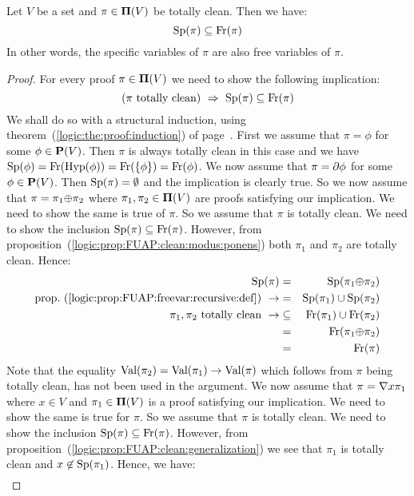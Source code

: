 \begin{prop}\label{logic:prop:FUAP:freevarproof:spec:free}
Let $V$ be a set and $\pi\in\mbox{${\bf\Pi}(V)$}$ be totally clean. Then we have:
    \[
    \mbox{\rm Sp}(\pi)\subseteq\mbox{\rm Fr}(\pi)
    \]
In other words, the specific variables of $\pi$ are also free
variables of $\pi$.
\end{prop}
\begin{proof}
For every proof $\pi\in\mbox{${\bf\Pi}(V)$}$ we need to show the following
implication:
    \[
    (\mbox{$\pi$ totally clean})\ \Rightarrow\ \spec(\pi)\subseteq\free(\pi)
    \]
We shall do so with a structural induction, using
theorem~(\ref{logic:the:proof:induction}) of
page~\pageref{logic:the:proof:induction}. First we assume that
$\pi=\phi$ for some $\phi\in\mbox{${\bf P}(V)$}$. Then $\pi$ is always totally clean
in this case and we have
$\mbox{\rm Sp}(\phi)=\mbox{\rm Fr}(\mbox{\rm Hyp}(\phi))=\mbox{\rm Fr}(\{\phi\})=\mbox{\rm Fr}(\phi)$. We now
assume that $\pi=\mbox{$\partial$}\phi$ for some $\phi\in\mbox{${\bf P}(V)$}$. Then
$\mbox{\rm Sp}(\pi)=\emptyset$ and the implication is clearly true. So we
now assume that $\pi=\pi_{1}\mbox{$\oplus$}\pi_{2}$ where
$\pi_{1},\pi_{2}\in\mbox{${\bf\Pi}(V)$}$ are proofs satisfying our implication. We
need to show the same is true of $\pi$. So we assume that $\pi$ is
totally clean. We need to show the inclusion
$\mbox{\rm Sp}(\pi)\subseteq\mbox{\rm Fr}(\pi)$. However, from
proposition~(\ref{logic:prop:FUAP:clean:modus:ponens}) both
$\pi_{1}$ and $\pi_{2}$ are totally clean. Hence:
    \begin{eqnarray*}
    \spec(\pi)&=&\spec(\pi_{1}\pon\pi_{2})\\
    \mbox{prop.~(\ref{logic:prop:FUAP:freevar:recursive:def})}\ \rightarrow
    &=&\spec(\pi_{1})\cup\spec(\pi_{2})\\
    \mbox{$\pi_{1},\pi_{2}$ totally clean}\ \rightarrow
    &\subseteq&\free(\pi_{1})\cup\free(\pi_{2})\\
    &=&\free(\pi_{1}\pon\pi_{2})\\
    &=&\free(\pi)\\
    \end{eqnarray*}
Note that the equality $\mbox{\rm Val}(\pi_{2})=\mbox{\rm Val}(\pi_{1})\to\mbox{\rm Val}(\pi)$
which follows from $\pi$ being totally clean, has not been used in
the argument. We now assume that $\pi=\mbox{$\nabla$} x\pi_{1}$ where $x\in V$
and $\pi_{1}\in\mbox{${\bf\Pi}(V)$}$ is a proof satisfying our implication. We need
to show the same is true for $\pi$. So we assume that $\pi$ is
totally clean. We need to show the inclusion
$\mbox{\rm Sp}(\pi)\subseteq\mbox{\rm Fr}(\pi)$. However, from
proposition~(\ref{logic:prop:FUAP:clean:generalization}) we see that
$\pi_{1}$ is totally clean and $x\not\in\mbox{\rm Sp}(\pi_{1})$. Hence, we
have:
    \begin{eqnarray*}

\end{eqnarray*}
\end{proof}
